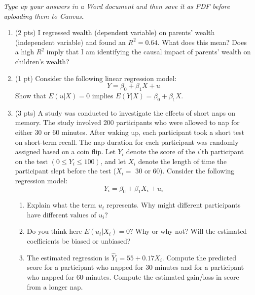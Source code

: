 \documentclass{./../../Latex/handout}
\begin{document}
\thispagestyle{plain}

\textit{Type up your answers in a Word document and then save it as PDF before uploading them to Canvas. 
}

\begin{enumerate}
\item (2 pts) I regressed wealth (dependent variable) on parents' wealth (independent variable) and found an $R^2=0.64$. What does this mean? Does a high $R^2$ imply that I am identifying the causal impact of parents' wealth on children's wealth? 

\item (1 pt) Consider the following linear regression model:
$$ Y = \beta_0 + \beta_1 X + u $$
Show that $E(u|X)=0$ implies  $E(Y|X) = \beta_0 + \beta_1 X $. 

\item (3 pts) A study was conducted to investigate the effects of short naps on memory. The study involved 200 participants who were allowed to nap for either 30 or 60 minutes. After waking up, each participant took a short test on short-term recall. The nap duration for each participant was randomly assigned based on a coin flip. Let $Y_i$ denote the score of the $i$'th participant on the test $(0 ≤ Y_i ≤ 100)$, and let $X_i$ denote the length of time the participant slept before the test ($X_i = $ 30 or 60). Consider the following regression model: $$ Y_i = \beta_0 + \beta_1 X_i + u_i $$ 
\begin{enumerate}
  \item Explain what the term $u_i$ represents. Why might different participants have different values of $u_i$?
  \item Do you think here $E(u_i|X_i) =0$? Why or why not? Will the estimated coefficients be biased or unbiased? 
\item The estimated regression is $ \hat{Y}_i = 55 + 0.17 X_i $. Compute the predicted score for a participant who napped for 30 minutes and for a participant who napped for 60 minutes. Compute the estimated gain/loss in score from a longer nap. 
\end{enumerate}


\end{enumerate}
\end{document}
